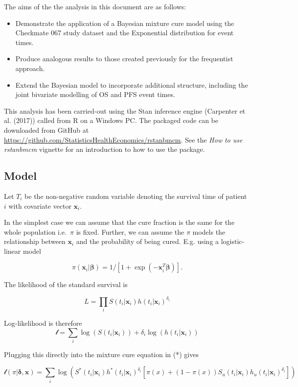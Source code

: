 \documentclass[
]{article}
\providecommand{\tightlist}{%
  \setlength{\itemsep}{0pt}\setlength{\parskip}{0pt}}
\begin{document}
The aims of the the analysis in this document are as follows:

\begin{itemize}
\tightlist
\item
  Demonstrate the application of a Bayesian mixture cure model using the
  Checkmate 067 study dataset and the Exponential distribution for event
  times.
\item
  Produce analogous results to those created previously for the
  frequentist approach.
\item
  Extend the Bayesian model to incorporate additional structure,
  including the joint bivariate modelling of OS and PFS event times.
\end{itemize}

This analysis has been carried-out using the Stan inference engine
(Carpenter et al. (2017)) called from R on a Windows PC. The packaged
code can be downloaded from GitHub at
\url{https://github.com/StatisticsHealthEconomics/rstanbmcm}. See the
\emph{How to use rstanbmcm} vignette for an introduction to how to use
the package.

\hypertarget{model}{%
\subsection{Model}\label{model}}

Let \(T_i\) be the non-negative random variable denoting the survival
time of patient \(i\) with covariate vector \(\boldsymbol{x}_i\).

In the simplest case we can assume that the cure fraction is the same
for the whole population i.e.~\(\pi\) is fixed. Further, we can assume
the \(\pi\) models the relationship between \(\boldsymbol{x}_i\) and the
probability of being cured. E.g. using a logistic-linear model

\[
\pi(\boldsymbol{x}_i | \boldsymbol{\beta}) = 1/[1 + \exp(-\boldsymbol{x}_i^T \boldsymbol{\beta})].
\]

The likelihood of the standard survival is

\[
L = \prod_i S(t_i | \boldsymbol{x}_i) h(t_i | \boldsymbol{x}_i)^{\delta_i}
\]

Log-likelihood is therefore \[
\mathcal{l} = \sum_i \log(S(t_i | \boldsymbol{x}_i)) + \delta_i \log(h(t_i | \boldsymbol{x}_i))
\]

Plugging this directly into the mixture cure equation in (*) gives

\[
\mathcal{l}(\pi | \boldsymbol{\delta}, \boldsymbol{x}) =
 \sum_i \log(S^*(t_i | \boldsymbol{x}_i) h^*(t_i | \boldsymbol{x}_i)^{\delta_i}[\pi(x) +
   (1 − \pi(x)) S_u(t_i | \boldsymbol{x}_i) h_u(t_i | \boldsymbol{x}_i)^{\delta_i}])
\]
\end{document}
